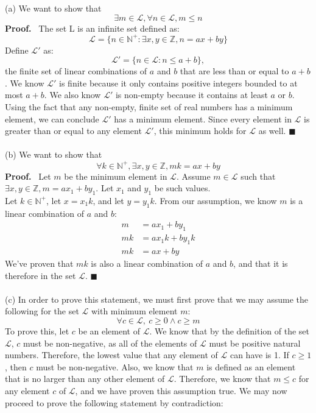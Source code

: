 \documentclass{article}
\newcommand{\Z}{\mathbb{Z}}
\newcommand{\N}{\mathbb{N}}
\begin{document}
\begin{enumerate}
	(a)  We want to show that $$\exists m \in \mathcal{L}, \forall n \in  \mathcal{L}, m \leq n$$
	\textbf{Proof.} \ The set L is an infinite set defined as: $$ \mathcal{L} = \{n\in \N^+ : \exists x,y \in \Z, n = ax + by\}$$
	Define  $\mathcal{L}'$ as: $$  \mathcal{L}' = \{ n \in \mathcal{L}: n \leq a + b\},$$ the finite set of linear combinations of $a$ and $b$ that are less than or 	equal to $a + b$. We know $\mathcal{L}'$ is finite because it only contains positive integers bounded to at most $a + b$. We also know $\mathcal{L}'$ is non-empty because it contains at least $a$ or $b$. Using the fact that any non-empty, finite set of real numbers has a minimum element, we can conclude $ \mathcal{L}'$ has a minimum element. Since every element in $\mathcal{L}$ is greater than or equal to any element $\mathcal{L}'$, this minimum holds for $\mathcal{L}$ as well. \null\hfill $\blacksquare$\\\\
	(b)  We want to show that $$\forall k \in \N^+, \exists x,y \in \Z, mk = ax + by$$
	\textbf{Proof.} \ Let $m$ be the minimum element in $\mathcal{L}$. Assume $m \in \mathcal{L}$ such that $\exists x,y \in \Z, m = ax_1 + by_1$. Let $x_1$ and $y_1$ be such values.\\
	Let $k \in \N^+$, let $x= x_1k$, and let $y=y_1k$. From our assumption, we know $m$ is a linear combination of $a$ and $b$:
	\begin{align*}
	m &= ax_1 + by_1\\
	mk &= ax_1k + by_1k\\
	mk &= ax + by
	\end{align*}
	We've proven that $mk$ is also a linear combination of $a$ and $b$, and that it is therefore in the set $\mathcal{L}$. \null\hfill $\blacksquare$\\\\
	(c) In order to prove this statement, we must first prove that we may assume the following for the set $\mathcal{L}$ with minimum element $m$:
	$$\forall c \in \mathcal{L},\ c \geq 0 \wedge c \geq m$$
	To prove this, let $c$ be an element of $\mathcal{L}$. We know that by the definition of the set $\mathcal{L}$, $c$ must be non-negative, as all of the elements of $\mathcal{L}$ must be positive natural numbers. Therefore, the lowest value that any element of $\mathcal{L}$ can have is 1. If $c \geq 1$, then $c$ must be non-negative. Also, we know that $m$ is defined as an element that is no larger than any other element of $\mathcal{L}$. Therefore, we know that $m \leq c$ for any element $c$ of $\mathcal{L}$, and we have proven this assumption true. We may now proceed to prove the following statement by contradiction: 

\end{enumerate}
\end{document}
